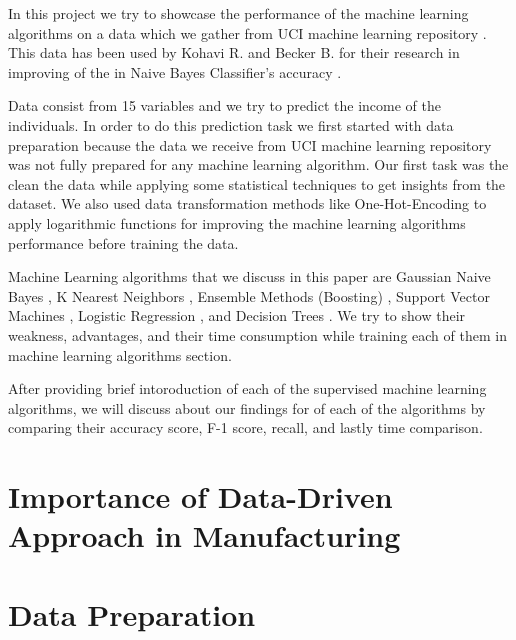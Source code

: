 \documentclass[sigconf]{acmart}
\begin{document}
In this project we try to showcase the performance of the machine learning algorithms on a data which we gather from UCI machine learning repository \cite{www-uci}. This data has been used by Kohavi R. and Becker B. for their research in improving of the in Naive Bayes Classifier's accuracy \cite{Kohavi:1996:SUA:3001460.3001502}. 
\par Data consist from 15 variables and we try to predict the income of the individuals. In order to do this prediction task we first started with data preparation because the data we receive from UCI machine learning repository \cite{www-uci} was not fully prepared for any machine learning algorithm. Our first task was the clean the data while applying some statistical techniques to get insights from the dataset. We also used data transformation methods like One-Hot-Encoding\cite{www-hackernoon} to apply logarithmic functions for improving the machine learning algorithms performance before training the data. 
\par Machine Learning algorithms that we discuss in this paper are Gaussian Naive Bayes \cite{www-wikipedia-naivebayes}, K Nearest Neighbors \cite{Lee2017-knn}, Ensemble Methods (Boosting) \cite{dietterich-ensemble}, Support Vector Machines \cite{www-simafore-svm}, Logistic Regression \cite{adarsh}, and Decision Trees \cite{www-wikipedia.decision}. We try to show their weakness, advantages, and their time consumption while training each of them in machine learning algorithms section. 
\par After providing brief intoroduction of each of the supervised machine learning algorithms, we will discuss about our findings for of each of the algorithms by comparing their accuracy score, F-1 score, recall, and lastly time comparison. 


\section{Importance of Data-Driven Approach in Manufacturing}




\section{Data Preparation}
\end{document}

